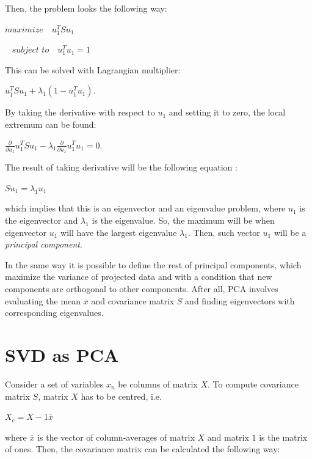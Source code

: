 Then, the problem looks the following way:

{\centering$maximize\,\,\,\,\,\,u_{1}^TSu_{1}$\\}

{\centering$\,\,\,\,\,subject \,\,to \,\,\,\,\,\,u_{1}^Tu_{1}=1$\\}

This can be solved with Lagrangian multiplier:

{\centering$u_{1}^TSu_{1}+\lambda_{1}(1-u_{1}^Tu_{1}).$\\}

By taking the derivative with respect to $u_{1}$ and setting it to zero, the local extremum can be found:

{\centering$\frac{\partial }{\partial u_{1}}u_{1}^TSu_{1}-\lambda_{1}\frac{\partial }{\partial u_{1}}u_{1}^Tu_{1}=0.$\\}

The result of taking derivative will be the following equation \cite{Bishop}:

{\centering$Su_{1}=\lambda_{1}u_{1}$\\}

which implies that this is an eigenvector and an eigenvalue problem, where $u_{1}$ is the eigenvector and $\lambda_{1}$ is the eigenvalue.
So, the maximum will be when eigenvector $u_{1}$ will have the largest eigenvalue $\lambda_{1}$. 
Then, such vector $u_{1}$ will be a \emph{principal component}.

In the same way it is possible to define the rest of principal components, 
which maximize the variance of projected data and with a condition that new components are orthogonal to other components.
After all, PCA involves evaluating the mean $\overline{x}$ and covariance matrix $S$ and finding eigenvectors with corresponding eigenvalues. 

 \section{SVD as PCA}
\label{section:svd}
Consider a set of variables $x_{n}$ be columns of matrix $X$. To compute covariance matrix $S$, matrix $X$ has to be centred, i.e. 

{\centering$X_{c}=X-1\overline{x}$\\}

where $\overline{x}$ is the vector of column-averages of matrix $X$ and matrix $1$ is the matrix of ones.
Then, the covariance matrix can be calculated the following way:

